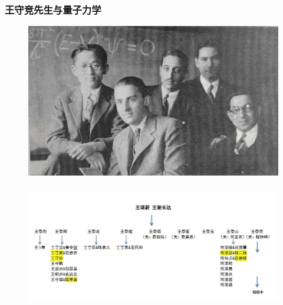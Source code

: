 \frame
{
	\frametitle{王守竞先生与量子力学}
\begin{figure}[h!]
\centering
\vspace{-10.5pt}
\includegraphics[height=0.65\textwidth,width=1.0\textwidth,viewport=0 0 560 350,clip]{Figures/Collect_Wang.jpg}
\caption{\fontsize{7.2pt}{6.5pt}}
\label{Collect_Wang}
\end{figure}
}

\frame
{
	\frametitle{}
\begin{figure}[h!]
\centering
\hspace*{-10.5pt}
\includegraphics[height=0.42\textwidth,width=1.05\textwidth,viewport=0 0 860 350,clip]{Figures/Wang_Family_Suzhou.jpg}
\caption{\fontsize{6.2pt}{5.5pt}}
\label{Wang_Family}
\end{figure}
}

